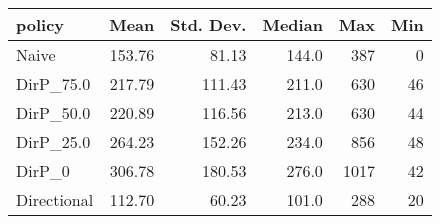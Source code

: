 \begin{tabular}{lrrrrr}
\toprule
     policy &   Mean &  Std. Dev. &  Median &  Max &  Min \\
\midrule
      Naive & 153.76 &      81.13 &   144.0 &  387 &    0 \\
  DirP\_75.0 & 217.79 &     111.43 &   211.0 &  630 &   46 \\
  DirP\_50.0 & 220.89 &     116.56 &   213.0 &  630 &   44 \\
  DirP\_25.0 & 264.23 &     152.26 &   234.0 &  856 &   48 \\
     DirP\_0 & 306.78 &     180.53 &   276.0 & 1017 &   42 \\
Directional & 112.70 &      60.23 &   101.0 &  288 &   20 \\
\bottomrule
\end{tabular}
